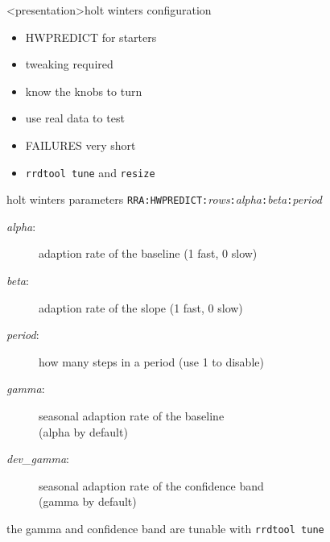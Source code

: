 \begin{frame}<presentation>{holt winters configuration}
\begin{itemize}[<+-| alert@+>]
\item HWPREDICT for starters
\item tweaking required
\item know the knobs to turn
\item use real data to test
\item FAILURES very short
\item \texttt{rrdtool tune} and \texttt{resize}
\end{itemize}
\end{frame}


\begin{frame}{holt winters parameters}
\texttt{RRA:HWPREDICT:}\emph{rows}\texttt{:}\emph{alpha}\texttt{:}\emph{beta}\texttt{:}\emph{period}

\begin{description}
\item[\emph{alpha}:] adaption rate of the baseline (1 fast, 0 slow)
\item[\emph{beta}:] adaption rate of the slope (1 fast, 0 slow)
\item[\emph{period}:] how many steps in a period (use 1 to  disable)
\item[\emph{gamma}:] seasonal adaption rate of the baseline\\(alpha by
  default)
\item[\emph{dev\_gamma}:] seasonal adaption rate of the confidence
  band\\
 (gamma by default)
\end{description}

the gamma and confidence band are tunable with \texttt{rrdtool tune}
\end{frame}

